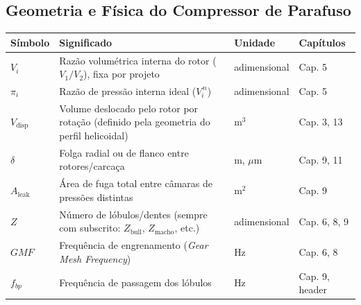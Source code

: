 \documentclass[12pt,a4paper]{article}
\numberwithin{equation}{section}
\numberwithin{table}{section}
\numberwithin{figure}{section}
\begin{document}
{\subsection*{Geometria e Física do Compressor de Parafuso}
\begin{longtable}{|p{2.0cm}|p{6.1cm}|p{2.1cm}|p{4.2cm}|}
	\hline
	\textbf{Símbolo} & \textbf{Significado} & \textbf{Unidade} & \textbf{Capítulos} \\ \hline
	\endhead
	$V_i$ & Razão volumétrica interna do rotor ($V_1/V_2$), fixa por projeto & adimensional & Cap. 5 \\ \hline
	$\pi_i$ & Razão de pressão interna ideal ($V_i^{\,n}$) & adimensional & Cap. 5 \\ \hline
	$V_{\text{disp}}$ & Volume deslocado pelo rotor por rotação (definido pela geometria do perfil helicoidal) & m$^3$ & Cap. 3, 13 \\ \hline
	$\delta$ & Folga radial ou de flanco entre rotores/carcaça & m, $\mu$m & Cap. 9, 11 \\ \hline
	$A_{\text{leak}}$ & Área de fuga total entre câmaras de pressões distintas & m$^2$ & Cap. 9 \\ \hline
	$Z$ & Número de lóbulos/dentes (sempre com subscrito: $Z_{\text{bull}}$, $Z_{\text{macho}}$, etc.) & adimensional & Cap. 6, 8, 9 \\ \hline
	$GMF$ & Frequência de engrenamento (\textit{Gear Mesh Frequency}) & Hz & Cap. 6, 8 \\ \hline
	$f_{bp}$ & Frequência de passagem dos lóbulos & Hz & Cap. 9, header \\ \hline
\end{longtable}

}
\end{document}
